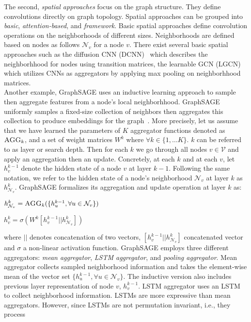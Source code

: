 The second, \emph{spatial approaches} focus on the graph structure. They define convolutions directly on graph topology. Spatial approaches can be grouped into \emph{basic}, \emph{attention-based}, and \emph{framework}. Basic spatial approaches define convolution operations on the neighborhoods of different sizes. Neighborhoods are defined based on nodes as follows $\mathcal{N}_v$ for a node $v$. There exist several basic spatial approaches such as the diffusion CNN (DCNN)~\parencite{DCNN_Atwood} which describes the neighborhhood for nodes using transition matrices, the learnable GCN (LGCN)~\parencite{LGCN_Gao} which utilizes CNNs as aggregators by applying max pooling on neighborhhood matrices.\\
Another example, GraphSAGE uses an inductive learning approach to sample then aggregate features from a node's local neighborhhood. GraphSAGE uniformly samples a fixed-size collection of neighbors then aggregates this collection to produce embeddings for the graph~\parencite{GraphSAGE_Hamilton}. More precisely, let us assume that we have learned the parameters of $K$ aggregator functions denoted as $\textsc{AGG}_k$, and a set of weight matrices $W^k$ where $\forall k \in \{1, \dots K\}$. $k$ can be referred to as layer or search depth. Then for each $k$ we go through all nodes $v \in \mathcal{V}$ and apply an aggregation then an update. Concretely, at each $k$ and at each $v$, let $h_v^{k-1}$ denote the hidden state of a node $v$ at layer $k-1$. Following the same notation, we refer to the hidden state of a node's neighborhood $\mathcal{N}_v$ at layer $k$ as $h_{\mathcal{N}_v}^k$. GraphSAGE formalizes its aggregation and update operation at layer $k$ as:
\begin{center}
    $h_{\mathcal{N}_v}^{k} = \textsc{AGG}_{k}(\{h_u^{k-1}, \forall u \in \mathcal{N}_v\})$
\end{center}
\begin{center}
    $h_v^k = \sigma(W^k [h_v^{k-1} || h_{\mathcal{N}_v}^k])$
\end{center}
where $||$ denotes concatenation of two vectors, $[h_v^{k-1} || h_{\mathcal{N}_v}^k]$ concatenated vector and $\sigma$
a non-linear activation function. GraphSAGE employs three different aggregators: \emph{mean aggregator}, \emph{LSTM aggregator}, and \emph{pooling aggregator}. Mean aggregator collects sampled neighborhood information and takes the element-wise mean of the vector set $\{h_u^{k-1}, \forall u \in \mathcal{N}_v\}$. The inductive version also includes previous layer representation of node $v$, $h_v^{k-1}$. LSTM aggregator uses an LSTM to collect neighborhood information. LSTMs are more expressive than mean aggregators. However, since LSTMs are not permutation invariant, i.e., they process
